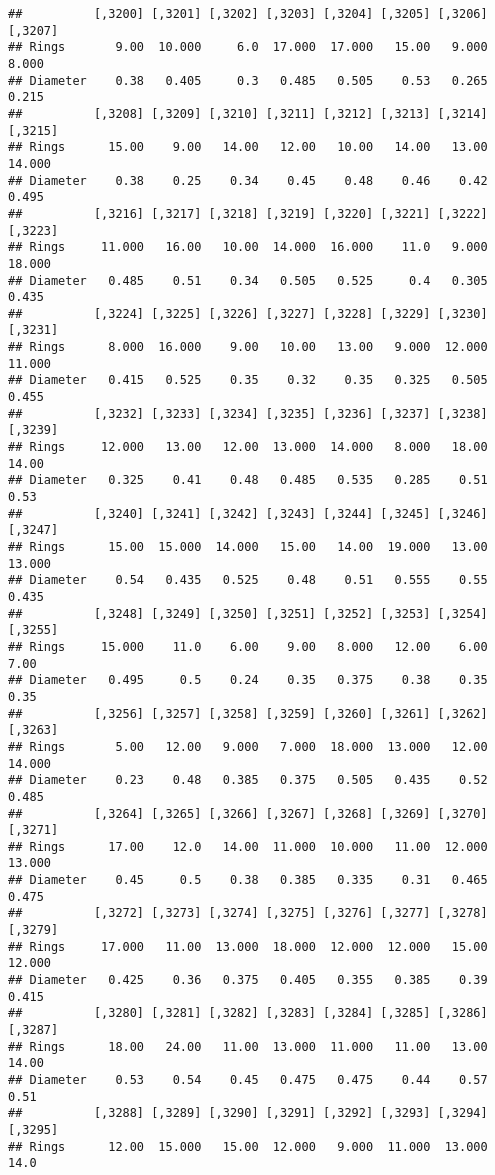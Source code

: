\documentclass[
]{article}
\begin{document}
\begin{verbatim}
##          [,3200] [,3201] [,3202] [,3203] [,3204] [,3205] [,3206] [,3207]
## Rings       9.00  10.000     6.0  17.000  17.000   15.00   9.000   8.000
## Diameter    0.38   0.405     0.3   0.485   0.505    0.53   0.265   0.215
##          [,3208] [,3209] [,3210] [,3211] [,3212] [,3213] [,3214] [,3215]
## Rings      15.00    9.00   14.00   12.00   10.00   14.00   13.00  14.000
## Diameter    0.38    0.25    0.34    0.45    0.48    0.46    0.42   0.495
##          [,3216] [,3217] [,3218] [,3219] [,3220] [,3221] [,3222] [,3223]
## Rings     11.000   16.00   10.00  14.000  16.000    11.0   9.000  18.000
## Diameter   0.485    0.51    0.34   0.505   0.525     0.4   0.305   0.435
##          [,3224] [,3225] [,3226] [,3227] [,3228] [,3229] [,3230] [,3231]
## Rings      8.000  16.000    9.00   10.00   13.00   9.000  12.000  11.000
## Diameter   0.415   0.525    0.35    0.32    0.35   0.325   0.505   0.455
##          [,3232] [,3233] [,3234] [,3235] [,3236] [,3237] [,3238] [,3239]
## Rings     12.000   13.00   12.00  13.000  14.000   8.000   18.00   14.00
## Diameter   0.325    0.41    0.48   0.485   0.535   0.285    0.51    0.53
##          [,3240] [,3241] [,3242] [,3243] [,3244] [,3245] [,3246] [,3247]
## Rings      15.00  15.000  14.000   15.00   14.00  19.000   13.00  13.000
## Diameter    0.54   0.435   0.525    0.48    0.51   0.555    0.55   0.435
##          [,3248] [,3249] [,3250] [,3251] [,3252] [,3253] [,3254] [,3255]
## Rings     15.000    11.0    6.00    9.00   8.000   12.00    6.00    7.00
## Diameter   0.495     0.5    0.24    0.35   0.375    0.38    0.35    0.35
##          [,3256] [,3257] [,3258] [,3259] [,3260] [,3261] [,3262] [,3263]
## Rings       5.00   12.00   9.000   7.000  18.000  13.000   12.00  14.000
## Diameter    0.23    0.48   0.385   0.375   0.505   0.435    0.52   0.485
##          [,3264] [,3265] [,3266] [,3267] [,3268] [,3269] [,3270] [,3271]
## Rings      17.00    12.0   14.00  11.000  10.000   11.00  12.000  13.000
## Diameter    0.45     0.5    0.38   0.385   0.335    0.31   0.465   0.475
##          [,3272] [,3273] [,3274] [,3275] [,3276] [,3277] [,3278] [,3279]
## Rings     17.000   11.00  13.000  18.000  12.000  12.000   15.00  12.000
## Diameter   0.425    0.36   0.375   0.405   0.355   0.385    0.39   0.415
##          [,3280] [,3281] [,3282] [,3283] [,3284] [,3285] [,3286] [,3287]
## Rings      18.00   24.00   11.00  13.000  11.000   11.00   13.00   14.00
## Diameter    0.53    0.54    0.45   0.475   0.475    0.44    0.57    0.51
##          [,3288] [,3289] [,3290] [,3291] [,3292] [,3293] [,3294] [,3295]
## Rings      12.00  15.000   15.00  12.000   9.000  11.000  13.000    14.0

\end{verbatim}
\end{document}
